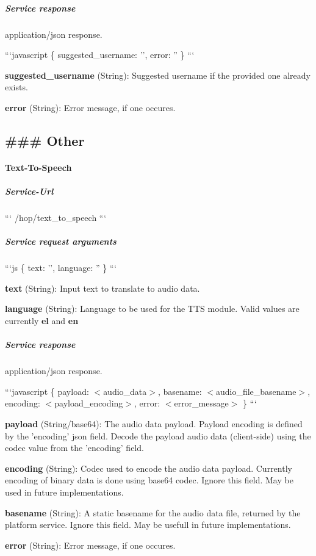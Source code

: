\subparagraph*{Service response}

application/json response.

```javascript \{ suggested\-\_\-username\-: '', error\-: '' \} ```


\begin{DoxyItemize}
\item {\bfseries suggested\-\_\-username} (String)\-: Suggested username if the provided one already exists.
\item {\bfseries error} (String)\-: Error message, if one occures.
\end{DoxyItemize}



 \subsection*{\#\#\# Other }

\paragraph*{Text-\/\-To-\/\-Speech}

\subparagraph*{Service-\/\-Url}

``` /hop/text\-\_\-to\-\_\-speech ```

\subparagraph*{Service request arguments}

```js \{ text\-: '', language\-: '' \} ```


\begin{DoxyItemize}
\item {\bfseries text} (String)\-: Input text to translate to audio data.
\item {\bfseries language} (String)\-: Language to be used for the T\-T\-S module. Valid values are currently {\bfseries el} and {\bfseries en}
\end{DoxyItemize}

\subparagraph*{Service response}

application/json response.

```javascript \{ payload\-: $<$audio\-\_\-data$>$, basename\-: $<$audio\-\_\-file\-\_\-basename$>$, encoding\-: $<$payload\-\_\-encoding$>$, error\-: $<$error\-\_\-message$>$ \} ```


\begin{DoxyItemize}
\item {\bfseries payload} (String/base64)\-: The audio data payload. Payload encoding is defined by the 'encoding' json field. Decode the payload audio data (client-\/side) using the codec value from the 'encoding' field.
\item {\bfseries encoding} (String)\-: Codec used to encode the audio data payload. Currently encoding of binary data is done using base64 codec. Ignore this field. May be used in future implementations.
\item {\bfseries basename} (String)\-: A static basename for the audio data file, returned by the platform service. Ignore this field. May be usefull in future implementations.
\item {\bfseries error} (String)\-: Error message, if one occures.
\end{DoxyItemize}

